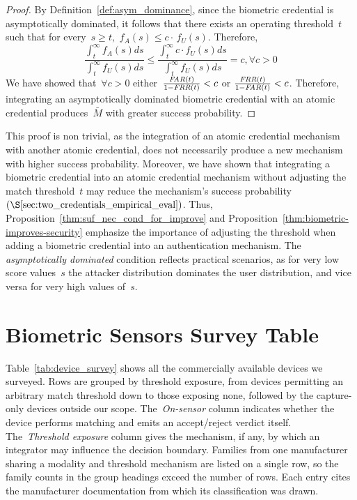 \documentclass[conference,compsoc]{IEEEtran}
\begin{document}
\begin{proof}
By Definition~\ref{def:asym_dominance}, since the biometric credential is asymptotically dominated, it follows that there exists an operating threshold~$t$ such that for every~$s \ge t,$ $f_A(s) \le c\cdot\,f_U(s)$. Therefore,
\begin{equation*}
\frac{\int_{t}^{\infty} f_A(s) ds}{\int_{t}^{\infty} f_U(s) ds} \le \frac{\int_{t}^{\infty} c \cdot f_U(s) ds}{\int_{t}^{\infty} f_U(s) ds} = c, \forall c > 0
\end{equation*}
We have showed that~$\forall c>0$ either~$\frac{\textit{FAR}(t)}{1-\textit{FRR}(t)} < c$ or $\frac{\textit{FRR}(t)}{1-\textit{FAR}(t)} < c$. Therefore, integrating an asymptotically dominated biometric credential with an atomic credential produces~$\bar{M}$ with greater success probability.
\end{proof}

This proof is non trivial, as the integration of an atomic credential mechanism with another atomic credential, does not necessarily produce a new mechanism with higher success probability. Moreover, we have shown that integrating a biometric credential into an atomic credential mechanism without adjusting the match threshold~$t$ may reduce the mechanism's success probability~$(\S\ref{sec:two_credentials_empirical_eval})$. Thus, Proposition~\ref{thm:suf_nec_cond_for_improve} and Proposition~\ref{thm:biometric-improves-security} emphasize the importance of adjusting the threshold when adding a biometric credential into an authentication mechanism.
The \emph{asymptotically dominated} condition reflects practical scenarios, as for very low score values~$s$ the attacker distribution dominates the user distribution, and vice versa for very high values of~$s$. 

\section{Biometric Sensors Survey Table}\label{app:Bio_table}
\noindent
Table~\ref{tab:device_survey} shows all the commercially available devices we surveyed. Rows are grouped by threshold exposure, from devices permitting an arbitrary match threshold down to those exposing none, followed by the capture-only devices outside our scope. The~\emph{On-sensor} column indicates whether the device performs matching and emits an accept/reject verdict itself. The~\emph{Threshold exposure} column gives the mechanism, if any, by which an integrator may influence the decision boundary. Families from one manufacturer sharing a modality and threshold mechanism are listed on a single row, so the family counts in the group headings exceed the number of rows. Each entry cites the manufacturer documentation from which its classification was drawn.
\end{document}
